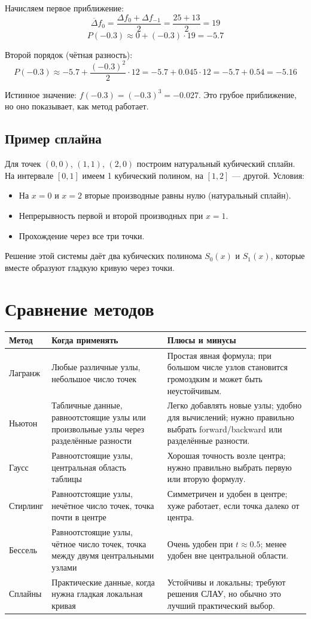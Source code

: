\documentclass[12pt,a4paper]{article}
\begin{document}
Начисляем первое приближение:
\[
\overline{\Delta} f_0 = \frac{\Delta f_0 + \Delta f_{-1}}{2} = \frac{25 + 13}{2} = 19
\]
\[
P(-0.3) \approx 0 + (-0.3) \cdot 19 = -5.7
\]

Второй порядок (чётная разность):
\[
P(-0.3) \approx -5.7 + \frac{(-0.3)^2}{2} \cdot 12 = -5.7 + 0.045 \cdot 12 = -5.7 + 0.54 = -5.16
\]

Истинное значение: $f(-0.3) = (-0.3)^3 = -0.027$. Это грубое приближение, но оно показывает, как метод работает.

\subsection{Пример сплайна}

Для точек $(0,0)$, $(1,1)$, $(2,0)$ построим натуральный кубический сплайн. На интервале $[0,1]$ имеем 1 кубический полином, на $[1,2]$ --- другой. Условия:
\begin{itemize}
\item На $x=0$ и $x=2$ вторые производные равны нулю (натуральный сплайн).
\item Непрерывность первой и второй производных при $x=1$.
\item Прохождение через все три точки.
\end{itemize}

Решение этой системы даёт два кубических полинома $S_0(x)$ и $S_1(x)$, которые вместе образуют гладкую кривую через точки.

\section{Сравнение методов}
\begin{center}
\begin{tabular}{p{3.2cm} p{4.0cm} p{5.1cm}}
\toprule
Метод & Когда применять & Плюсы и минусы \\
\midrule
Лагранж & Любые различные узлы, небольшое число точек & Простая явная формула; при большом числе узлов становится громоздким и может быть неустойчивым. \\
Ньютон & Табличные данные, равноотстоящие узлы или произвольные узлы через разделённые разности & Легко добавлять новые узлы; удобно для вычислений; нужно правильно выбрать forward/backward или разделённые разности. \\
Гаусс & Равноотстоящие узлы, центральная область таблицы & Хорошая точность возле центра; нужно правильно выбрать первую или вторую формулу. \\
Стирлинг & Равноотстоящие узлы, нечётное число точек, точка почти в центре & Симметричен и удобен в центре; хуже работает, если точка далеко от центра. \\
Бессель & Равноотстоящие узлы, чётное число точек, точка между двумя центральными узлами & Очень удобен при $t\approx0.5$; менее удобен вне центральной области. \\
Сплайны & Практические данные, когда нужна гладкая локальная кривая & Устойчивы и локальны; требуют решения СЛАУ, но обычно это лучший практический выбор. \\
\bottomrule
\end{tabular}
\end{center}
\end{document}
